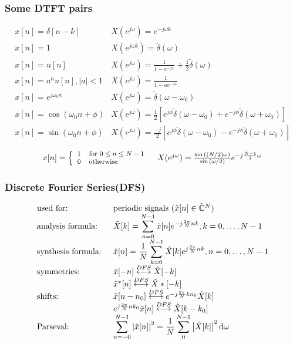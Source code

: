\documentclass{article}
\begin{document}
\begin{multicols}{2}
\subsubsection{Some DTFT pairs}
$$
\begin{array}{ll}
x[n] = \delta[n-k] & X(e^{j\omega}) = e^{-j\omega k} \\
x[n] = 1 & X(e^{j\omega k})  = \tilde\delta (\omega) \\
x[n] = u[n] & X(e^{j\omega}) =\displaystyle \frac1{1-e^{-j\omega}} + \frac12\tilde\delta(\omega) \\
x[n] = a^nu[n], |a|<1 & X(e^{j\omega}) =\displaystyle \frac1{1-ae^{-j\omega}}\\
x[n] = e^{j\omega_0 n} & X(e^{j\omega}) = \tilde\delta(\omega- \omega_0) \\
x[n] = \cos (\omega_0 n + \phi) & X(e^{j\omega}) = \frac12 [ e^{j\phi} \tilde\delta(\omega- \omega_0) + e^{-j\phi} \tilde\delta(\omega+\omega_0)  ]\\
x[n] = \sin (\omega_0 n + \phi) & X(e^{j\omega}) = \frac{-j}2 [ e^{j\phi} \tilde\delta(\omega- \omega_0) - e^{-j\phi} \tilde\delta(\omega+\omega_0)  ]\\
\end{array}
$$ $$
\begin{array}{ll}
x[n] = \left\{ \footnotesize{\begin{array}{ll} 1 & \text{for } 0\leq n\leq N-1 \\ 0 & \text{otherwise} \end{array}}\right.
& X(e^{j\omega}) = \frac{\sin{((N/2)\omega)}}{\sin{(\omega/2)}}e^{-j\frac{N-1}2 \omega} \\
\end{array}
$$
\newcommand{\Wnp}[1]{e^{-j\frac{2\pi}N #1}} %
\newcommand{\Wnm}[1]{e^{j\frac{2\pi}N #1}} %
\subsubsection{Discrete Fourier Series(DFS)}
$$
\begin{array}{ll}
\text{used for:}  & \text{periodic signals (} \tilde x [n] \in \tilde{\mathbb{C}} ^N \text ) \\
\text{analysis formula: }& \tilde X[k] = \displaystyle \sum_{n=0}^{N-1} \tilde x[n]\Wnp{nk}, k = 0,\ldots, N-1\\
\text{synthesis formula: }& \tilde x[n]= \displaystyle \frac1N  \sum_{k=0}^{N-1} \tilde X[k] \Wnm{nk}, n = 0,\ldots, N-1 \\
\text{symmetries:} & \tilde x[-n]   \overset{DFS}{\longleftrightarrow}  \tilde X[-k] \\
&\tilde x^*[n]   \overset{DFS}{\longleftrightarrow}  \tilde X*[-k] \\
\text{shifts:} & \tilde x[n-n_0]  \overset{DFS}{\longleftrightarrow} \Wnp{kn_0} \tilde X[k]\\
& \Wnm{nk_0}\tilde x[n] \overset{DFS}{\longleftrightarrow} \tilde X[k - k_0]\\
\text{Parseval:} & \displaystyle \sum_{n=-0}^{N-1} \left | \tilde x[n] \right | ^2 = \frac1N \displaystyle \sum_0^{N-1} \left | \tilde X[k] \right | ^2 \mathrm{d} \omega
\end{array}
$$

\end{multicols}
\end{document}
